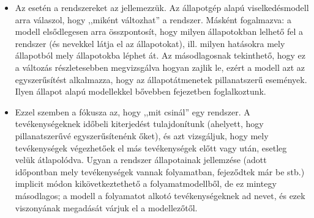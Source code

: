 \begin{itemize}
	\item Az  esetén a rendszereket az  jellemezzük. Az állapotgép alapú viselkedésmodell arra válaszol, hogy ,,miként változhat'' a rendszer. Másként fogalmazva: a modell elsődlegesen arra összpontosít, hogy milyen állapotokban lelhető fel a rendszer (és nevekkel látja el az állapotokat), ill. milyen hatásokra mely állapotból mely állapotokba léphet át. Az másodlagosnak tekinthető, hogy ez a változás részletesebben megvizsgálva hogyan zajlik le, ezért a modell azt az egyszerűsítést alkalmazza, hogy az állapotátmenetek pillanatszerű események. Ilyen állapot alapú modellekkel bővebben   fejezetben foglalkoztunk.
	\item Ezzel szemben a  fókusza az, hogy ,,mit csinál'' egy rendszer. A tevékenységeknek időbeli kiterjedést tulajdonítunk (ahelyett, hogy pillanatszerűvé egyszerűsítenénk őket), és azt vizsgáljuk, hogy mely tevékenységek végezhetőek el más tevékenységek előtt vagy után, esetleg velük átlapolódva. Ugyan a rendszer állapotainak jellemzése (adott időpontban mely tevékenységek vannak folyamatban, fejeződtek már be stb.) implicit módon kikövetkeztethető a folyamatmodellből, de ez mintegy másodlagos; a modell a folyamatot alkotó tevékenységeknek ad nevet, és ezek viszonyának megadását várjuk el a modellezőtől.
\end{itemize}

%

%


